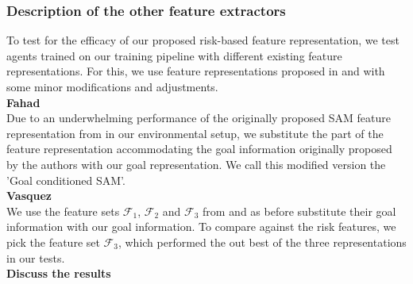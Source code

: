 \subsubsection*{Description of the other feature extractors}
To test for the efficacy of our proposed risk-based feature representation, we test agents trained on our training pipeline with different existing feature representations. For this, we use feature representations proposed in \cite{fahadLearningHowPedestrians2018a} and \cite{vasquezInverseReinforcementLearning2014a} with some minor modifications and adjustments.\\
\textbf{Fahad}\\
Due to an underwhelming performance of the originally proposed SAM feature representation from \cite{fahadLearningHowPedestrians2018a} in our environmental setup, we substitute the part of the feature representation accommodating the goal information originally proposed by the authors with our goal representation. We call this modified version the 'Goal conditioned SAM'.\\
\textbf{Vasquez}\\
We use the feature sets $\mathcal{F}_1$, $\mathcal{F}_2$ and $\mathcal{F}_3$ from \cite{vasquezInverseReinforcementLearning2014a} and as before substitute their goal information with our goal information.
To compare against the risk features, we pick the feature set $\mathcal{F}_3$, which performed the out best of the three representations in our tests.\\
\textbf{Discuss the results}
